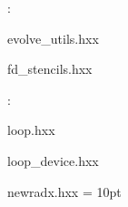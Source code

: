 \vspace{5mm}

: 



evolve\_utils.hxx

fd\_stencils.hxx
\vspace{2mm}

: 

loop.hxx

loop\_device.hxx

newradx.hxx
\vspace{2mm}\parskip = 10pt 
